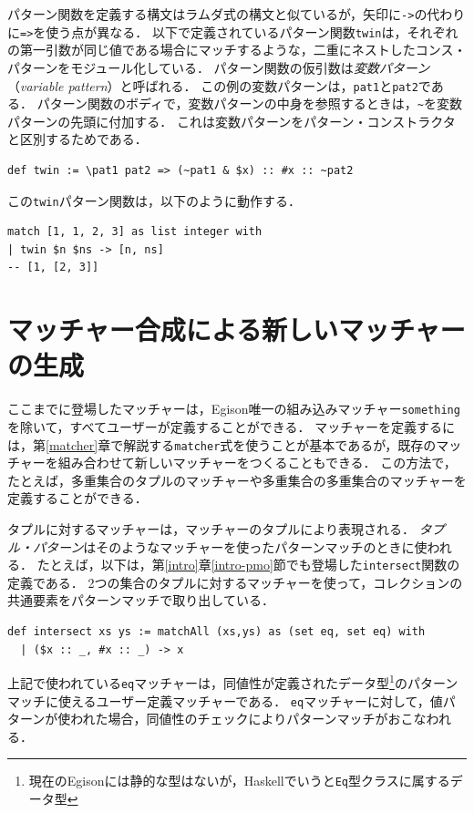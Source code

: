 パターン関数を定義する構文はラムダ式の構文と似ているが，矢印に\lstinline{->}の代わりに\lstinline{=>}を使う点が異なる．
以下で定義されているパターン関数\lstinline{twin}は，それぞれの第一引数が同じ値である場合にマッチするような，二重にネストしたコンス・パターンをモジュール化している．
パターン関数の仮引数は\emph{変数パターン}（\emph{variable pattern}）と呼ばれる．
この例の変数パターンは，\lstinline{pat1}と\lstinline{pat2}である．
パターン関数のボディで，変数パターンの中身を参照するときは，\lstinline{~}を変数パターンの先頭に付加する．
これは変数パターンをパターン・コンストラクタと区別するためである．
\begin{lstlisting}[language=egison,numbers=none]
def twin := \pat1 pat2 => (~pat1 & $x) :: #x :: ~pat2
\end{lstlisting}
この\lstinline{twin}パターン関数は，以下のように動作する．
\begin{lstlisting}[language=egison,numbers=none]
match [1, 1, 2, 3] as list integer with
| twin $n $ns -> [n, ns]
-- [1, [2, 3]]
\end{lstlisting}

\section{マッチャー合成による新しいマッチャーの生成}\label{quick-matcher-composition}

ここまでに登場したマッチャーは，Egison唯一の組み込みマッチャー\lstinline{something}を除いて，すべてユーザーが定義することができる．
マッチャーを定義するには，第\ref{matcher}章で解説する\lstinline{matcher}式を使うことが基本であるが，既存のマッチャーを組み合わせて新しいマッチャーをつくることもできる．
この方法で，たとえば，多重集合のタプルのマッチャーや多重集合の多重集合のマッチャーを定義することができる．

タプルに対するマッチャーは，マッチャーのタプルにより表現される．
\emph{タプル・パターン}はそのようなマッチャーを使ったパターンマッチのときに使われる．
たとえば，以下は，第\ref{intro}章\ref{intro-pmo}節でも登場した\lstinline{intersect}関数の定義である．
2つの集合のタプルに対するマッチャーを使って，コレクションの共通要素をパターンマッチで取り出している．
\begin{lstlisting}[language=egison,numbers=none]
def intersect xs ys := matchAll (xs,ys) as (set eq, set eq) with
  | ($x :: _, #x :: _) -> x
\end{lstlisting}
上記で使われている\lstinline{eq}マッチャーは，同値性が定義されたデータ型\footnote{現在のEgisonには静的な型はないが，Haskellでいうと\lstinline{Eq}型クラスに属するデータ型}のパターンマッチに使えるユーザー定義マッチャーである．
\lstinline{eq}マッチャーに対して，値パターンが使われた場合，同値性のチェックによりパターンマッチがおこなわれる．

